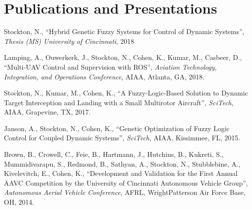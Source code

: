 \documentclass[letterpaper]{deedy-resume}
\begin{document}
\begin{minipage}[t]{\textwidth}
    \section{Publications and Presentations}
    \begin{compactitem}
    \item Stockton, N., ``Hybrid Genetic Fuzzy Systems for Control of Dynamic Systems'', \emph{Thesis (MS) University
            of Cincinnati}, 2018
        \item Lamping, A., Ouwerkerk, J., Stockton, N., Cohen, K., Kumar, M., Casbeer, D., ``Multi-UAV Control
            and Supervision with ROS'', \emph{Aviation Technology, Integration, and Operations Conference},
            AIAA, Atlanta, GA, 2018.
        \item Stockton, N., Kumar, M., Cohen, K., ``A Fuzzy-Logic-Based Solution to Dynamic Target
            Interception and Landing with a Small Multirotor Aircraft'', \emph{SciTech}, AIAA, Grapevine, TX,
            2017.
        \item Janson, A., Stockton, N., Cohen, K., ``Genetic Optimization of Fuzzy Logic Control for Coupled Dynamic Systems'', \emph{SciTech}, AIAA, Kissimmee, FL, 2015.
        \item Brown, B., Crowell, C., Feie, B., Hartmann, J., Hutchins, B., Kukreti, S., Mummidivarapu, S., Redmond, B., Sathyan, A., Stockton, N., Stubblebine, A., Kivelevitch, E., Cohen, K., ``Development and Validation for the First Annual AAVC Competition by the University of Cincinnati Autonomous Vehicle Group'', \emph{Autonomous Aerial Vehicle Conference}, AFRL, Wright\textendash Patterson Air Force Base, OH, 2014.
    \end{compactitem}
    

\end{minipage} %




\end{document}
